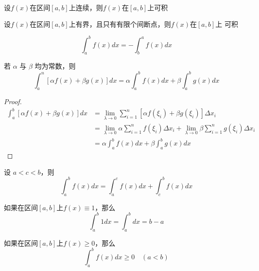 \documentclass[11pt]{article}
\begin{document}
\begin{theorem}[]
设\(f(x)\)在区间\([a,b]\)上连续，则\(f(x)\)在\([a,b]\)上可积
\end{theorem}

\begin{theorem}[]
设\(f(x)\)在区间\([a,b]\)上有界，且只有有限个间断点，则\(f(x)\)在\([a,b]\)上
可积
\end{theorem}

\begin{equation*}
\int_a^bf(x)dx=-\int_b^af(x)dx
\end{equation*}

\begin{proposition}[]
若 \(\alpha\) 与 \(\beta\) 均为常数，则
\begin{equation*}
\int_a^n[\alpha f(x)+\beta g(x)]dx=\alpha\int_a^bf(x)dx+\beta\int_a^b g(x)dx
\end{equation*}
\end{proposition}

\begin{proof}
\begin{align*}
\int_a^b[\alpha f(x)+\beta g(x)]dx&=\lim_{\lambda\to0}\sum_{i=1}^n[\alpha f(\xi_i)+\beta g(\xi_i)]\Delta x_i\\
&=\lim_{\lambda\to0}\alpha\sum_{i=1}^nf(\xi_i)\Delta x_i+
\lim_{\lambda\to0}\beta\sum_{i=1}^n g(\xi_i)\Delta x_i\\
&=\alpha\int_a^bf(x)dx+\beta\int_a^bg(x)dx
\end{align*}
\end{proof}

\begin{proposition}[]
设 \(a<c<b\)，则
\begin{equation*}
\int_a^bf(x)dx=\int_a^cf(x)dx+\int_c^bf(x)dx
\end{equation*}
\end{proposition}

\begin{proposition}[]
如果在区间\([a,b]\)上\(f(x)\equiv1\)，那么
\begin{equation*}
\int_a^b1dx=\int_a^bdx=b-a
\end{equation*}
\end{proposition}

\begin{proposition}[]
如果在区间\([a,b]\)上\(f(x)\ge0\)，那么
\begin{equation*}
\int_a^bf(x)dx\ge0\quad(a<b)
\end{equation*}
\end{proposition}
\end{document}
